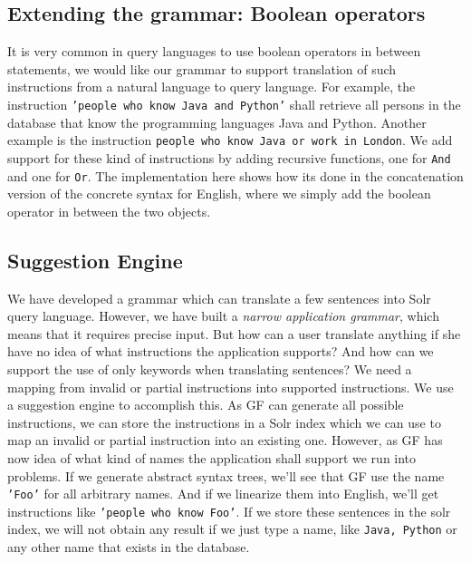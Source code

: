 \documentclass[
10pt, %
a4paper, %
oneside, %
headinclude,footinclude, %
BCOR5mm, %
]{scrartcl}
\begin{document}
\subsection{Extending the grammar: Boolean operators}
It is very common in query languages to use boolean operators in between statements, we would like our grammar to support translation of such instructions from a natural language to query language.
\newline
\newline
For example, the instruction \texttt{'people who know Java and Python'} shall retrieve all persons in the database that know the programming languages Java and Python.
\newline
\newline
Another example is the instruction \texttt{people who know Java or work in London}.
\newline
\newline
We add support for these kind of instructions by adding recursive functions, one for \texttt{And} and one for \texttt{Or}. The implementation here shows how its done in the concatenation version of the concrete syntax for English, where we simply add the boolean operator in between the two objects.

\subsection{Suggestion Engine}
We have developed a grammar which can translate a few sentences into Solr query language. However, we have built a \emph{narrow application grammar}, which means that it requires precise input. But how can a user translate anything if she have no idea of what instructions the application supports? And how can we support the use of only keywords when translating sentences?
\newline
\newline
We need a mapping from invalid or partial instructions into supported instructions.
\newline
\newline
We use a suggestion engine to accomplish this.
\newline
\newline
As GF can generate all possible instructions, we can store the instructions in a Solr index which we can use to map an invalid or partial instruction into an existing one.
\newline
\newline
However, as GF has now idea of what kind of names the application shall support we run into problems.
\newline
\newline
If we generate abstract syntax trees, we'll see that GF use the name \texttt{'Foo'} for all arbitrary names.
\newline
\newline
And if we linearize them into English, we'll get instructions like \texttt{'people who know Foo'}. If we store these sentences in the solr index, we will not obtain any result if we just type a name, like \texttt{Java, Python} or any other name that exists in the database.
\end{document}
